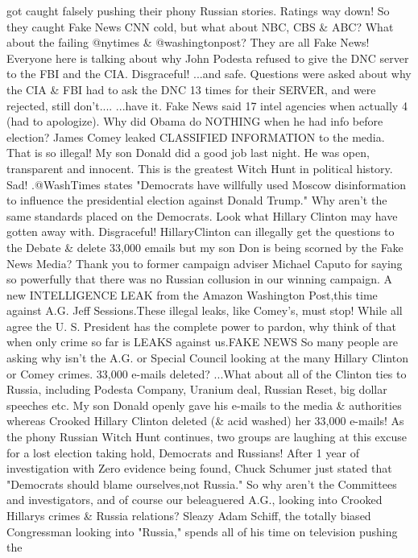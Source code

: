 got caught falsely pushing their phony Russian stories. Ratings way
down! So they caught Fake News CNN cold, but what about NBC, CBS \& ABC?
What about the failing @nytimes \& @washingtonpost? They are all Fake
News! Everyone here is talking about why John Podesta refused to give
the DNC server to the FBI and the CIA. Disgraceful! ...and safe.
Questions were asked about why the CIA \& FBI had to ask the DNC 13
times for their SERVER, and were rejected, still don't.... ...have it.
Fake News said 17 intel agencies when actually 4 (had to apologize). Why
did Obama do NOTHING when he had info before election? James Comey
leaked CLASSIFIED INFORMATION to the media. That is so illegal! My son
Donald did a good job last night. He was open, transparent and innocent.
This is the greatest Witch Hunt in political history. Sad! .@WashTimes
states "Democrats have willfully used Moscow disinformation to influence
the presidential election against Donald Trump." Why aren't the same
standards placed on the Democrats. Look what Hillary Clinton may have
gotten away with. Disgraceful! HillaryClinton can illegally get the
questions to the Debate \& delete 33,000 emails but my son Don is being
scorned by the Fake News Media? Thank you to former campaign adviser
Michael Caputo for saying so powerfully that there was no Russian
collusion in our winning campaign. A new INTELLIGENCE LEAK from the
Amazon Washington Post,this time against A.G. Jeff Sessions.These
illegal leaks, like Comey's, must stop! While all agree the U. S.
President has the complete power to pardon, why think of that when only
crime so far is LEAKS against us.FAKE NEWS So many people are asking why
isn't the A.G. or Special Council looking at the many Hillary Clinton or
Comey crimes. 33,000 e-mails deleted? ...What about all of the Clinton
ties to Russia, including Podesta Company, Uranium deal, Russian Reset,
big dollar speeches etc. My son Donald openly gave his e-mails to the
media \& authorities whereas Crooked Hillary Clinton deleted (\& acid
washed) her 33,000 e-mails! As the phony Russian Witch Hunt continues,
two groups are laughing at this excuse for a lost election taking hold,
Democrats and Russians! After 1 year of investigation with Zero evidence
being found, Chuck Schumer just stated that "Democrats should blame
ourselves,not Russia." So why aren't the Committees and investigators,
and of course our beleaguered A.G., looking into Crooked Hillarys crimes
\& Russia relations? Sleazy Adam Schiff, the totally biased Congressman
looking into "Russia," spends all of his time on television pushing the
